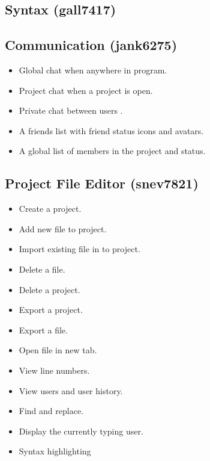 \documentclass[11pt]{report}
\begin{document}
    \subsection{Syntax (gall7417)}
    
    \subsection{Communication (jank6275)}
        \begin{itemize}
            \item Global chat when anywhere in program.
            \item Project chat when a project is open.
            \item Private chat between users .
            \item A friends list with friend status icons and avatars.
            \item A global list of members in the project and status.
        \end{itemize}
    \subsection{Project File Editor (snev7821)}
        \begin{itemize}
            \item Create a project.
            \item Add new file to project.
            \item Import existing file in to project.
            \item Delete a file.
            \item Delete a project.
            \item Export a project.
            \item Export a file.
            \item Open file in new tab.
            \item View line numbers.
            \item View users and user history.
            \item Find and replace.
            \item Display the currently typing user.
            \item Syntax highlighting
        \end{itemize}
\end{document}
